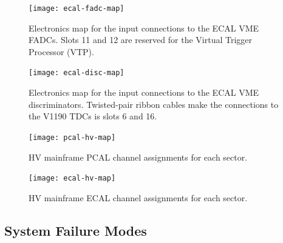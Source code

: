 \documentclass[letterpaper,10pt]{article}
\begin{document}
\begin{figure}
  \hspace{1cm}
  \texttt{[image: ecal-fadc-map]}
  \caption{Electronics map for the input connections to the ECAL VME FADCs. Slots 11 and 12 are
  reserved for the Virtual Trigger Processor (VTP).}
  \label{ecal-fadc-map}
\end{figure}

\begin{figure}
  \hspace{1cm}
  \texttt{[image: ecal-disc-map]}
  \caption{Electronics map for the input connections to the ECAL VME discriminators.  Twisted-pair ribbon
  cables make the connections to the V1190 TDCs is slots 6 and 16.}
  \label{ecal-disc-map}
\end{figure}


\begin{figure}
  \hspace{1cm}  \texttt{[image: pcal-hv-map]}
\caption{HV mainframe PCAL channel assignments for each sector.}
\label{pcal-hv-map}
\end{figure}
\begin{figure}
  \hspace{1cm}
  \texttt{[image: ecal-hv-map]}
\caption{HV mainframe ECAL channel assignments for each sector.}
\label{ecal-hv-map}
\end{figure}

\newpage

\subsection{System Failure Modes}
\label{repairs}
\end{document}
